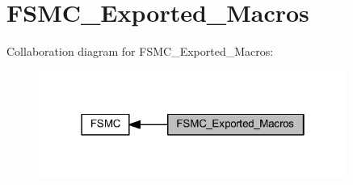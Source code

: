 \hypertarget{group___f_s_m_c___exported___macros}{}\section{F\+S\+M\+C\+\_\+\+Exported\+\_\+\+Macros}
\label{group___f_s_m_c___exported___macros}
Collaboration diagram for F\+S\+M\+C\+\_\+\+Exported\+\_\+\+Macros\+:
\nopagebreak
\begin{figure}[H]
\begin{center}
\leavevmode
\includegraphics[width=286pt]{group___f_s_m_c___exported___macros}
\end{center}
\end{figure}
